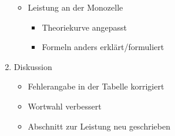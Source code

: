 \begin{enumerate}
\begin{itemize}
                  \item Leistung an der Monozelle
                        \begin{itemize}
                              \item Theoriekurve angepasst
                              \item Formeln anders erklärt/formuliert
                        \end{itemize}
            \end{itemize}
      \item Diskussion
            \begin{itemize}
                  \item Fehlerangabe in der Tabelle korrigiert
                  \item Wortwahl verbessert
                  \item Abschnitt zur Leistung neu geschrieben
            \end{itemize}
\end{enumerate}
